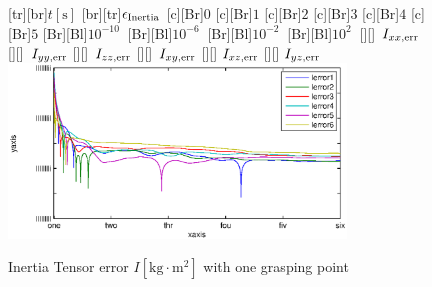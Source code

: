 \begin{figure}
	\centering	
	[tr][br]{$t\left[\mathrm{s}\right]$}
	[br][tr]{$\epsilon_{\mathrm{Inertia}}$}
	[Br]{$0$}
	[Br]{$1$}
	[Br]{$2$}
	[Br]{$3$}
	[Br]{$4$}
	[Br]{$5$}
	[Br][Bl]{$10^{-10}\  $}
	[Br][Bl]{$10^{-6}\  $}
	[Br][Bl]{$10^{-2}\  $}
	[Br][Bl]{$10^2\  $}
	[][]{\tiny \  $I_{xx,\mathrm{err}}$}
	[][]{\tiny \  $I_{yy,\mathrm{err}}$}
	[][]{\tiny \  $I_{zz,\mathrm{err}}$}
	[][]{\tiny \  $I_{xy,\mathrm{err}}$}
	[][]{\tiny \hspace{0.5cm} $I_{xz,\mathrm{err}}$}
	[][]{\tiny \hspace{0.5cm} $I_{yz,\mathrm{err}}$}
	\includegraphics[width=0.8\textwidth]{figures/inertia.eps}
	\vspace{0.2cm}
	\caption[Inertia Tensor error]{Inertia Tensor error $I \left[\mathrm{kg} \cdot \mathrm{m}^2\right]$ with one grasping point}
	\label{fig:estim_inertia}
\end{figure}

